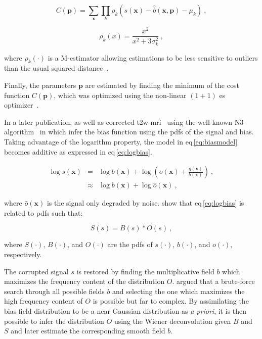 \begin{equation}
	C(\mathbf{p}) = \sum_{\mathbf{x}} \prod_{k} \rho_k(s(\mathbf{x}) - \hat{b}(\mathbf{x},\mathbf{p}) - \mu_k) \ ,
	\label{eq:costbias}
\end{equation}

\begin{equation}
	\rho_k(x) = \frac{x^2}{x^2 + 3 \sigma_k^2} \ ,
	\label{eq:mestbias}
\end{equation}

\noindent where $\rho_k(\cdot)$ is a M-estimator allowing estimations to be less sensitive to outliers than the usual squared distance~\cite{Li1996}.

Finally, the parameters $\mathbf{p}$ are estimated by finding the minimum of the cost function $C(\mathbf{p})$, which was optimized using the non-linear $(1+1)$ \ac{es} optimizer~\cite{Styner1997}.

In a later publication, \citeauthor{Viswanath2012} as well as \citeauthor{giannini2015fully} corrected \ac{t2w}-\ac{mri}~\cite{Viswanath2012,giannini2015fully} using the well known N3 algorithm~\cite{Sled1998} in which \citeauthor{Sled1998} infer the bias function using the \acp{pdf} of the signal and bias.
Taking advantage of the logarithm property, the model in \acs{eq}\,\eqref{eq:biasmodel} becomes additive as expressed in \acs{eq}\,\eqref{eq:logbias}.

\begin{eqnarray}
	\log s(\mathbf{x}) & = & \log b(\mathbf{x}) + \log \left( o(\mathbf{x}) + \frac{\eta(\mathbf{x})}{b(\mathbf{x})} \right) \ , \nonumber \\
	& \approx & \log b(\mathbf{x}) + \log \hat{o}(\mathbf{x}) \ , \label{eq:logbias}
\end{eqnarray}

\noindent where $\hat{o}(\mathbf{x})$ is the signal only degraded by noise. \citeauthor{Sled1998} show that \acs{eq}\,\eqref{eq:logbias} is related to \acp{pdf} such that:

\begin{equation}
	S(s) = B(s) * O(s) \ ,
	\label{eq:distrbias} 
\end{equation}

\noindent where $S(\cdot)$, $B(\cdot)$, and $O(\cdot)$ are the \acp{pdf} of $s(\cdot)$, $b(\cdot)$, and $o(\cdot)$, respectively.

The corrupted signal $s$ is restored by finding the multiplicative field $b$ which maximizes the frequency content of the distribution $O$.
\citeauthor{Sled1998} argued that a brute-force search through all possible fields $b$ and selecting the one which maximizes the high frequency content of $O$ is possible but far to complex.
By assimilating the bias field distribution to be a near Gaussian distribution as \textit{a priori}, it is then possible to infer the distribution $O$ using the Wiener deconvolution given $B$ and $S$ and later estimate the corresponding smooth field $b$.


